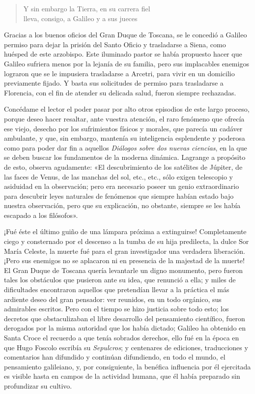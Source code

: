 \documentclass[a4paper, 12pt, draft]{article}
\begin{document}
{\begin{verse}

Y sin embargo la Tierra, en su carrera fiel\\
 lleva, consigo, a Galileo y a sus jueces 

\end{verse}



Gracias a los buenos oficios del Gran Duque de Toscana, se le concedió a Galileo permiso para dejar la prisión del Santo Oficio y trasladarse a Siena, como huésped de este arzobispo. Este iluminado pastor se había propuesto hacer que Galileo sufriera menos por la lejanía de su familia, pero sus implacables enemigos lograron que se le impusiera trasladarse a Arcetri, para vivir en un domicilio previamente fijado. Y basta sus solicitudes de permiso para trasladarse a Florencia, con el fin de atender su delicada salud, fueron siempre rechazadas.

Concédame el lector el poder pasar por alto otros episodios de este largo proceso, porque deseo hacer resaltar, ante vuestra atención, el raro fenómeno que ofrecía ese viejo, desecho por los sufrimientos físicos y morales, que parecía un cadáver ambulante, y que, sin embargo, mantenía su inteligencia esplendente y poderosa como para poder dar fin a aquellos \textit{ Diálogos sobre dos nuevas ciencias}, en la que se deben buscar los fundamentos de la moderna dinámica. Lagrange a propósito de esto, observa
agudamente: «El descubrimiento de los satélites de Júpiter, de las faces de Venus, de las manchas del sol, etc., etc., sólo exigen telescopio y asiduidad en la observación; pero era necesario poseer un genio extraordinario para descubrir leyes naturales de fenómenos que siempre habían estado bajo nuestra observación, pero que su explicación, no obstante, siempre se les había escapado a los filósofos».

¡Fué éste el último guiño de una lámpara próxima a extinguirse! Completamente ciego y consternado por el descenso a la tumba de su hija predilecta, la dulce Sor María Celeste, la muerte fué para el gran investigador una verdadera liberación. ¡Pero sus enemigos no se aplacaron ni en presencia de la majestad de la muerte! El Gran Duque de Toscana quería levantarle un digno monumento, pero fueron tales los obstáculos que pusieron ante su idea, que renunció a ella; y miles de dificultades encontraron aquellos que pretendían llevar a la práctica el más ardiente deseo del gran pensador: ver reunidos, en un todo orgánico, sus admirables escritos. Pero con el tiempo se hizo justicia sobre todo esto; los decretos que obstaculizaban el libre desarrollo del pensamiento científico, fueron derogados por la misma autoridad que los había dictado; Galileo ha obtenido en Santa Croce el recuerdo a que tenía sobrados derechos, ello fué en la época en que Hugo Foscolo escribía su \textit{ Sepulcros}; y centenares de ediciones, traducciones y comentarios han difundido y continúan difundiendo, en todo el mundo, el pensamiento galileiano, y, por consiguiente, la benéfica influencia por él ejercitada es visible hasta en campos de la actividad humana, que él había preparado
sin profundizar su cultivo.

}
\end{document}
